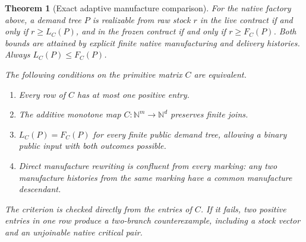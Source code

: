 \documentclass[11pt]{article}
\newtheorem{theorem}{Theorem}[section]
\theoremstyle{definition}
\theoremstyle{remark}
\begin{document}
\begin{theorem}[Exact adaptive manufacture comparison]
\label{arc:profile}
For the native factory above, a demand tree $P$ is realizable from raw
stock $r$ in the live contract if and only if $r\ge L_C(P)$, and in the
frozen contract if and only if $r\ge F_C(P)$.
Both bounds are attained by explicit finite native manufacturing and
delivery histories. Always $L_C(P)\le F_C(P)$.

The following conditions on the primitive matrix $C$ are equivalent.
\begin{enumerate}
\item Every row of $C$ has at most one positive entry.
\item The additive monotone map $C:\mathbb N^m\to\mathbb N^d$
preserves finite joins.
\item $L_C(P)=F_C(P)$ for every finite public demand tree, allowing a
binary public input with both outcomes possible.
\item Direct manufacture rewriting is confluent from every marking:
any two manufacture histories from the same marking have a common
manufacture descendant.
\end{enumerate}
The criterion is checked directly from the entries of $C$. If it fails,
two positive entries in one row produce a two-branch counterexample,
including a stock vector and an unjoinable native critical pair.
\end{theorem}
\end{document}
